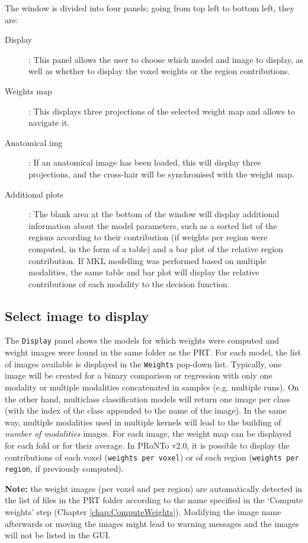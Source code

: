 The window is divided into four panels; going from top left to bottom left, they
are:
\begin{description}
\item[Display]: This panel allows the user to choose which model and image to display, as well as whether to display the voxel weights or the region contributions.
\item[Weights map]: This displays three projections of the selected weight map and allows to navigate it.
\item[Anatomical img]: If an anatomical image has been loaded, this will display three projections,
and the cross-hair will be synchronised with the weight map.
\item[Additional plots]: The blank area at the bottom of the window will display additional information about the model parameters, such as a sorted list of the regions according to their contribution (if weights per region were computed, in the form of a table) and a bar plot of the relative region contribution. If MKL modelling was performed based on multiple modalities, the same table and bar plot will display the relative contributions of each modality to the decision function. 
\end{description}

\subsection{Select image to display}

The \texttt{Display} panel shows the models for which weights were computed and weight images were found in the same folder as the PRT. For each model, the list of images available is displayed in the \texttt{Weights} pop-down list. Typically, one image will be created for a binary comparison or regression with only one modality or multiple modalities concatenated in samples (e.g. multiple runs). On the other hand, multiclass classification models will return one image per class (with the index of the class appended to the name of the image). In the same way, multiple modalities used in multiple kernels will lead to the building of \textit{number of modalities} images. For each image, the weight map can be displayed for each fold or for their average. In PRoNTo v2.0, it is possible to display the contributions of each voxel (\texttt{weights per voxel}) or of each region (\texttt{weights per region}, if previously computed).

\textbf{Note:} the weight images (per voxel and per region) are automatically detected in the list of files in the PRT folder according to the name specified in the `Compute weights' step (Chapter \ref{chap:ComputeWeights}). Modifying the image name afterwards or moving the images might lead to warning messages and the images will not be listed in the GUI.

